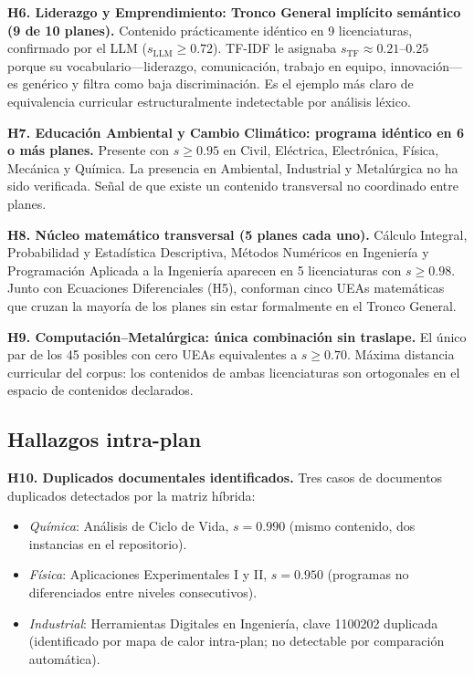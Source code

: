 \documentclass[11pt,a4paper]{article}
\begin{document}
\begin{hallazgo}
\textbf{H6. Liderazgo y Emprendimiento: Tronco General implícito semántico (9 de 10 planes).}
Contenido prácticamente idéntico en 9 licenciaturas, confirmado por el LLM ($s_{\mathrm{LLM}} \geq 0.72$).
TF-IDF le asignaba $s_{\mathrm{TF}} \approx 0.21$--$0.25$ porque su vocabulario---liderazgo, comunicación, trabajo en equipo, innovación---es genérico y filtra como baja discriminación.
Es el ejemplo más claro de equivalencia curricular estructuralmente indetectable por análisis léxico.
\end{hallazgo}

\begin{hallazgo}
\textbf{H7. Educación Ambiental y Cambio Climático: programa idéntico en 6 o más planes.}
Presente con $s \geq 0.95$ en Civil, Eléctrica, Electrónica, Física, Mecánica y Química.
La presencia en Ambiental, Industrial y Metalúrgica no ha sido verificada.
Señal de que existe un contenido transversal no coordinado entre planes.
\end{hallazgo}

\begin{hallazgo}
\textbf{H8. Núcleo matemático transversal (5 planes cada uno).}
Cálculo Integral, Probabilidad y Estadística Descriptiva, Métodos Numéricos en Ingeniería y Programación Aplicada a la Ingeniería aparecen en 5 licenciaturas con $s \geq 0.98$.
Junto con Ecuaciones Diferenciales (H5), conforman cinco UEAs matemáticas que cruzan la mayoría de los planes sin estar formalmente en el Tronco General.
\end{hallazgo}

\begin{hallazgo}
\textbf{H9. Computación--Metalúrgica: única combinación sin traslape.}
El único par de los 45 posibles con cero UEAs equivalentes a $s \geq 0.70$.
Máxima distancia curricular del corpus: los contenidos de ambas licenciaturas son ortogonales en el espacio de contenidos declarados.
\end{hallazgo}

\subsection{Hallazgos intra-plan}

\begin{hallazgo}
\textbf{H10. Duplicados documentales identificados.}
Tres casos de documentos duplicados detectados por la matriz híbrida:
\begin{itemize}[nosep,leftmargin=1.5em]
  \item \textit{Química}: Análisis de Ciclo de Vida, $s = 0.990$
    (mismo contenido, dos instancias en el repositorio).
  \item \textit{Física}: Aplicaciones Experimentales I y II, $s = 0.950$
    (programas no diferenciados entre niveles consecutivos).
  \item \textit{Industrial}: Herramientas Digitales en Ingeniería, clave 1100202 duplicada
    (identificado por mapa de calor intra-plan; no detectable por comparación automática).
\end{itemize}
\end{hallazgo}
\end{document}
